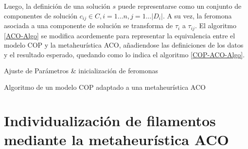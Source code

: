 Luego, la definici\'on de una soluci\'on $s$ puede representarse como un conjunto de componentes de soluci\'on $c_{ij} \in C, i = 1 \dotsc n, j = 1 \dotsc |D_i|$. A su vez, la feromona asociada a una componente de soluci\'on se transforma de $\tau_i$ a $\tau_{ij}$. El algoritmo  \ref{ACO-Algo} se modifica acordemente para representar la equivalencia entre el modelo COP y la metaheur\'istica ACO, a\~nadiendose las definiciones de los datos y el resultado esperado, quedando como lo indica el algoritmo \ref{COP-ACO-Algo}. 


\begin{algorithm}[H]
\SetAlgoLined
{}
 Ajuste de Par\'ametros \& inicializaci\'on de feromonas \;
 \caption{Algoritmo de un modelo COP adaptado a una metaheur\'istica ACO}\label{COP-ACO-Algo}
\end{algorithm}

\section{Individualizaci\'on de filamentos mediante la metaheur\'istica ACO}


